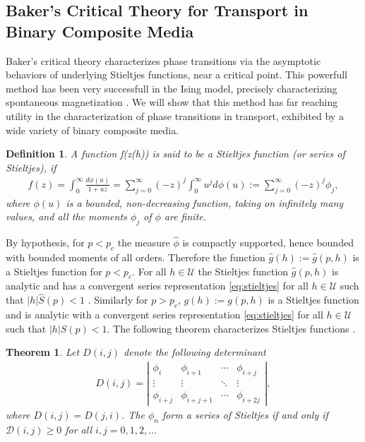 \documentclass[english,12pt,jmp,graphicx]{revtex4-1}
\newtheorem{theorem}{Theorem}[section]
\newtheorem{definition}{Definition}[section]
\newcommand{\ph}{\hat{\phi}}
\begin{document}
\subsection{Baker's Critical Theory for Transport in Binary Composite
  Media}
%
Baker's critical theory characterizes phase transitions via the
asymptotic behaviors of underlying Stieltjes functions, near a critical 
point. This powerfull method has been very successfull in the Ising
model, precisely characterizing spontaneous magnetization
\cite{Baker-1990}. We will show that this method has far reaching
utility in the characterization of phase transitions in transport,
exhibited by a wide variety of binary composite media.   
%
\begin{definition}  \label{def:stieltjes}
  A function f(z(h)) is said to be a \emph{Stieltjes function} (or
  \emph{series of Stieltjes}), if 
  \begin{align} \label{eq:stieltjes}
    f(z)=\int_0^\infty\frac{d\phi(u)}{1+uz}
    =\sum_{j =0}^\infty(-z)^j\int_0^\infty u^jd\phi(u)
    :=\sum_{j =0}^\infty(-z)^j\phi_j,
  \end{align}
  where $\phi(u)$ is a bounded, non-decreasing function, taking on
  infinitely many values, and all the moments $\phi_j$ of $\phi$ are
  finite.  
\end{definition}
%
By hypothesis, for $p<p_c$ the measure $\ph$ is compactly supported,
hence bounded with bounded moments of all orders. Therefore the
function $\hat{g}(h):=\hat{g}(p,h)$ is a Stieltjes function for
$p<p_c$. For all $h\in\mathcal{U}$ the Stieltjes function $\hat{g}(p,h)$
is analytic and has a convergent series representation
\eqref{eq:stieltjes} for all $h\in\mathcal{U}$ such that
$|h|\hat{S}(p)<1$ \cite{Golden:PRL-3935,Golden:CMP-473}. Similarly for
$p>p_c$, $g(h):=g(p,h)$ is a Stieltjes function and is analytic
with a convergent series representation \eqref{eq:stieltjes} for all
$h\in\mathcal{U}$ such that $|h|S(p)<1$. The following theorem
characterizes Stieltjes functions \cite{Baker-1990}.  
% 
\begin{theorem} \label{thm:stieltjes_Characterization}
   Let $D(i,j)$ denote the following determinant
    \begin{align} \label{eq:Detf} 
     D(i,j) = \left|
                 \begin{matrix}
                   \phi_i&\phi_{i+1}&\cdots&\phi_{i+j}\\ 
                   \vdots&\vdots&\ddots&\vdots\\
                   \phi_{i+j}&\phi_{i+j+1}&\cdots&\phi_{i+2j}                            
                   \end{matrix}
              \right| ,    
   \end{align}
   where $D(i,j)=D(j,i)$. The $\phi_n$ form a series of Stieltjes if and
   only if $\mathcal{D}(i,j) \geq 0$ for all $i,j =0,1,2,\ldots$

 \end{theorem}
\end{document}
